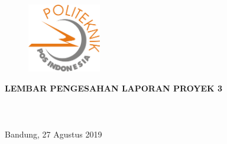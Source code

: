 \begin{pengesahan}
\thispagestyle{plain}
	
\begin{figure}[!htbp]
	\centering
	\includegraphics[width=32mm]{figures/logo-poltekpos} \\[4ex]
\end{figure} 

\centering\textbf{LEMBAR PENGESAHAN LAPORAN PROYEK 3} \\[2ex]

 \\
 \\
 \\[2ex]

Bandung, 27 Agustus 2019 \\[2ex]


\end{pengesahan}
